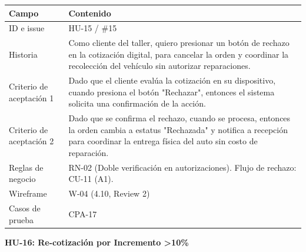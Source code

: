 {\def\LTcaptype{none} %
\begin{longtable}[]{@{}
  >{\raggedright\arraybackslash}p{}
  >{\raggedright\arraybackslash}p{}@{}}
\toprule\noalign{}
\begin{minipage}[b]{\linewidth}\raggedright
\textbf{Campo}
\end{minipage} & \begin{minipage}[b]{\linewidth}\raggedright
\textbf{Contenido}
\end{minipage} \\
\midrule\noalign{}
\endhead
\bottomrule\noalign{}
\endlastfoot
ID e issue & HU-15 / \#15 \\
Historia & Como cliente del taller, quiero presionar un botón de rechazo
en la cotización digital, para cancelar la orden y coordinar la
recolección del vehículo sin autorizar reparaciones. \\
Criterio de aceptación 1 & Dado que el cliente evalúa la cotización en
su dispositivo, cuando presiona el botón "Rechazar", entonces el sistema
solicita una confirmación de la acción. \\
Criterio de aceptación 2 & Dado que se confirma el rechazo, cuando se
procesa, entonces la orden cambia a estatus "Rechazada" y notifica a
recepción para coordinar la entrega física del auto sin costo de
reparación. \\
Reglas de negocio & RN-02 (Doble verificación en autorizaciones). Flujo
de rechazo: CU-11 (A1). \\
Wireframe & W-04 (4.10, Review 2) \\
Casos de prueba & CPA-17 \\
\end{longtable}
}

\textbf{HU-16: Re-cotización por Incremento \textgreater10\%}

